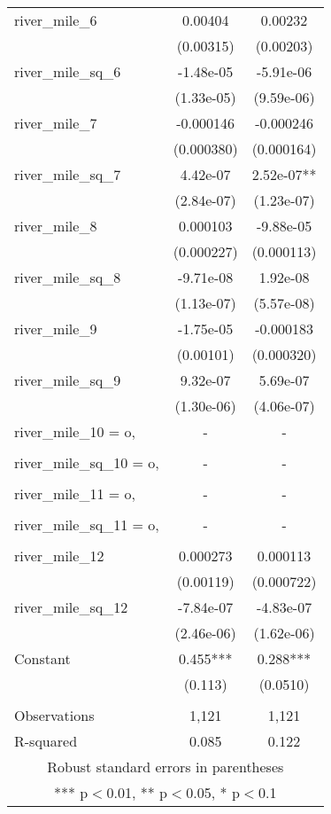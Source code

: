 \begin{tabular}{lcc}
river\_mile\_6 & 0.00404 & 0.00232 \\
 & (0.00315) & (0.00203) \\
river\_mile\_sq\_6 & -1.48e-05 & -5.91e-06 \\
 & (1.33e-05) & (9.59e-06) \\
river\_mile\_7 & -0.000146 & -0.000246 \\
 & (0.000380) & (0.000164) \\
river\_mile\_sq\_7 & 4.42e-07 & 2.52e-07** \\
 & (2.84e-07) & (1.23e-07) \\
river\_mile\_8 & 0.000103 & -9.88e-05 \\
 & (0.000227) & (0.000113) \\
river\_mile\_sq\_8 & -9.71e-08 & 1.92e-08 \\
 & (1.13e-07) & (5.57e-08) \\
river\_mile\_9 & -1.75e-05 & -0.000183 \\
 & (0.00101) & (0.000320) \\
river\_mile\_sq\_9 & 9.32e-07 & 5.69e-07 \\
 & (1.30e-06) & (4.06e-07) \\
river\_mile\_10 = o, & - & - \\
 &  &  \\
river\_mile\_sq\_10 = o, & - & - \\
 &  &  \\
river\_mile\_11 = o, & - & - \\
 &  &  \\
river\_mile\_sq\_11 = o, & - & - \\
 &  &  \\
river\_mile\_12 & 0.000273 & 0.000113 \\
 & (0.00119) & (0.000722) \\
river\_mile\_sq\_12 & -7.84e-07 & -4.83e-07 \\
 & (2.46e-06) & (1.62e-06) \\
Constant & 0.455*** & 0.288*** \\
 & (0.113) & (0.0510) \\
 &  &  \\
Observations & 1,121 & 1,121 \\
 R-squared & 0.085 & 0.122 \\ \hline
\multicolumn{3}{c}{ Robust standard errors in parentheses} \\
\multicolumn{3}{c}{ *** p$<$0.01, ** p$<$0.05, * p$<$0.1} \\
\end{tabular}
